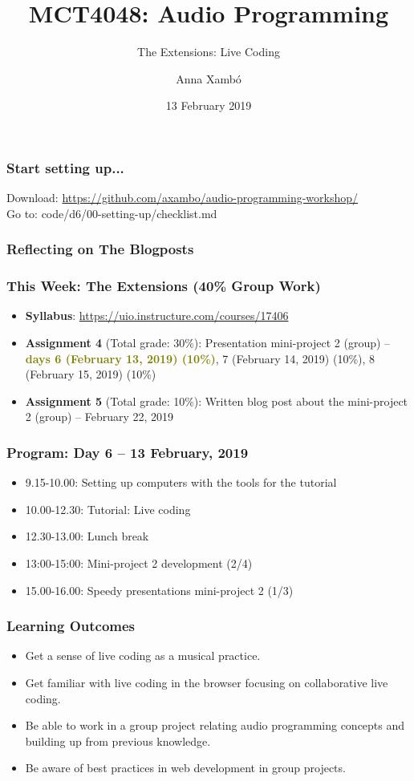 \documentclass[screen, aspectratio=43]{beamer}
\title[AP-intro]{MCT4048: Audio Programming}
\subtitle{The Extensions: Live Coding}
\author[A. Xamb{\'o}]{Anna Xamb{\'o}}
\institute[NTNU]{Department of Music, NTNU}
\date{13 February 2019}
\begin{document}
\begin{frame}
  \titlepage
\end{frame}

%
\begin{frame}
\frametitle{Start setting up...}
Download: \url{https://github.com/axambo/audio-programming-workshop/} 
\\
\vspace{10 mm}
Go to: \textrm{code/d6/00-setting-up/checklist.md}
\end{frame}
%
\begin{frame}
\frametitle{Reflecting on The Blogposts}
\end{frame}
%
\begin{frame}
\frametitle{This Week: The Extensions (40\% Group Work)}
\begin{itemize}
\item \textbf{Syllabus}: \url{https://uio.instructure.com/courses/17406}
\item \textbf{Assignment 4} (Total grade: 30\%): Presentation mini-project 2 (group) -- \textbf{\textcolor{olive}{days 6 (February 13, 2019) (10\%)}}, 7 (February 14, 2019) (10\%), 8 (February 15, 2019) (10\%)
\item \textbf{Assignment 5} (Total grade: 10\%):  Written blog post about the mini-project 2 (group) -- February 22, 2019
\end{itemize}
\end{frame}
%
\begin{frame}
\frametitle{Program: Day 6 -- 13 February, 2019}
\begin{itemize}
\item 9.15-10.00: Setting up computers with the tools for the tutorial
\item 10.00-12.30: Tutorial: Live coding
\item 12.30-13.00: Lunch break
\item 13:00-15:00: Mini-project 2 development (2/4)
\item 15.00-16.00: Speedy presentations mini-project 2 (1/3)
\end{itemize}
\end{frame}
%
\begin{frame}
\frametitle{Learning Outcomes}
\begin{itemize}
\item Get a sense of live coding as a musical practice.
\item Get familiar with live coding in the browser focusing on collaborative live coding.
\item Be able to work in a group project relating audio programming concepts and building up from previous knowledge.
\item Be aware of best practices in web development in group projects.
\end{itemize}
\end{frame}%
\end{document}
